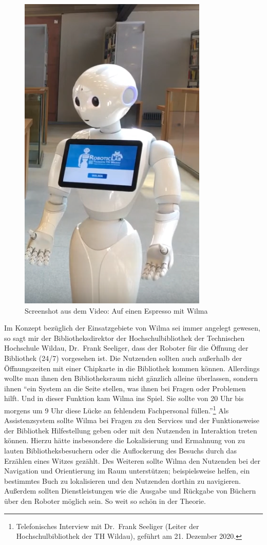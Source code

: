 \documentclass[a4paper,
fontsize=11pt,
oneside,
numbers=noperiodatend,
parskip=half-,
bibliography=totoc,
final
]{scrartcl}
\begin{document}
\begin{figure}
\centering
\includegraphics{img/Wilma.PNG}
\caption{Screenshot aus dem Video: Auf einen Espresso mit Wilma}
\end{figure}

Im Konzept bezüglich der Einsatzgebiete von Wilma sei immer angelegt
gewesen, so sagt mir der Bibliotheksdirektor der Hochschulbibliothek der
Technischen Hochschule Wildau, Dr.~Frank Seeliger, dass der Roboter für
die Öffnung der Bibliothek (24/7) vorgesehen ist. Die Nutzenden sollten
auch außerhalb der Öffnungszeiten mit einer Chipkarte in die Bibliothek
kommen können. Allerdings wollte man ihnen den Bibliotheksraum nicht
gänzlich alleine überlassen, sondern ihnen \enquote{ein System an die
Seite stellen, was ihnen bei Fragen oder Problemen hilft. Und in dieser
Funktion kam Wilma ins Spiel. Sie sollte von 20 Uhr bis morgens um 9 Uhr
diese Lücke an fehlendem Fachpersonal füllen.}\footnote{Telefonisches
  Interview mit Dr.~Frank Seeliger (Leiter der Hochschulbibliothek der
  TH Wildau), geführt am 21. Dezember 2020.} Als Assistenzsystem sollte
Wilma bei Fragen zu den Services und der Funktionsweise der Bibliothek
Hilfestellung geben oder mit den Nutzenden in Interaktion treten können.
Hierzu hätte insbesondere die Lokalisierung und Ermahnung von zu lauten
Bibliotheksbesuchern oder die Auflockerung des Besuchs durch das
Erzählen eines Witzes gezählt. Des Weiteren sollte Wilma den Nutzenden
bei der Navigation und Orientierung im Raum unterstützen; beispielsweise
helfen, ein bestimmtes Buch zu lokalisieren und den Nutzenden dorthin zu
navigieren. Außerdem sollten Dienstleistungen wie die Ausgabe und
Rückgabe von Büchern über den Roboter möglich sein. So weit so schön in
der Theorie.
\end{document}
